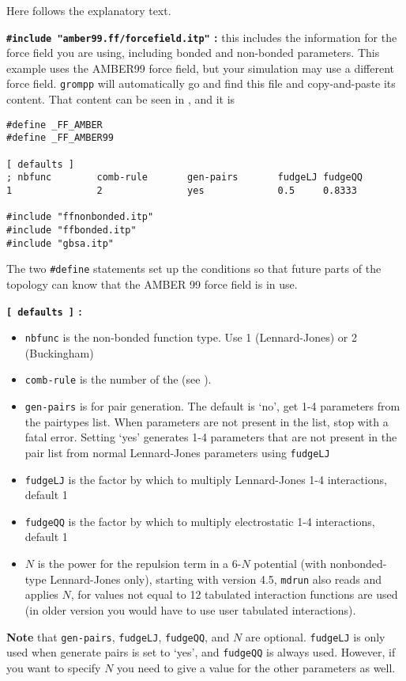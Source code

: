 Here follows the explanatory text.

{\bf {\tt \#include "amber99.ff/forcefield.itp"} :} this includes the
information for the force field you are using, including
bonded and non-bonded parameters. This example uses the AMBER99 force
field, but your simulation may use a different force field.
{\tt grompp} will automatically go and find this file and copy-and-paste
its content. That content can be seen in
, and it is

{\small
\begin{verbatim}
#define _FF_AMBER
#define _FF_AMBER99

[ defaults ]
; nbfunc        comb-rule       gen-pairs       fudgeLJ fudgeQQ
1               2               yes             0.5     0.8333

#include "ffnonbonded.itp"
#include "ffbonded.itp"
#include "gbsa.itp"
\end{verbatim}}

The two {\tt \#define} statements set up the conditions so that
future parts of the topology can know that the AMBER 99 force
field is in use.

{\bf {\tt [~defaults~]} :}
\begin{itemize}
\item {\tt nbfunc} is the non-bonded function type. Use 1 (Lennard-Jones) or 2 (Buckingham)
\item {\tt comb-rule} is the number of the  (see ).
\item {\tt gen-pairs} is for pair generation. The default is `no', {\ie} 
get 1-4 parameters from the pairtypes list. When parameters
are not present in the list, stop with a fatal error.
Setting `yes' generates 1-4 parameters that are not present in the pair list
from normal Lennard-Jones parameters using {\tt fudgeLJ}
\item {\tt fudgeLJ} is the factor by which to multiply Lennard-Jones 1-4 interactions, default 1
\item {\tt fudgeQQ} is the factor by which to multiply electrostatic 1-4 interactions, default 1
\item $N$ is the power for the repulsion term in a 6-$N$ potential (with 
nonbonded-type Lennard-Jones only), starting with {\gromacs} version 4.5,
{\tt mdrun} also reads and applies $N$, for values not equal to 12 tabulated
interaction functions are used
(in older version you would have to use user tabulated interactions).
\end{itemize}
{\bf Note} that {\tt gen-pairs}, {\tt fudgeLJ}, {\tt fudgeQQ}, and $N$ are optional.
{\tt fudgeLJ} is only used when generate pairs is set to `yes', and
{\tt fudgeQQ} is always used. However, if you
want to specify $N$ you need to give a value for the other parameters as well.


